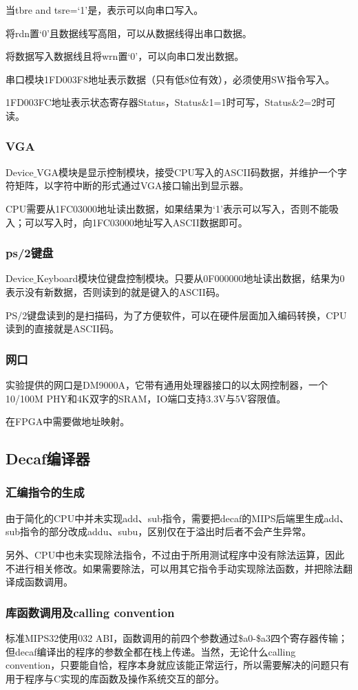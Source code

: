 当tbre and tsre=‘1’是，表示可以向串口写入。

将rdn置‘0’且数据线写高阻，可以从数据线得出串口数据。

将数据写入数据线且将wrn置‘0’，可以向串口发出数据。

串口模块1FD003F8地址表示数据（只有低8位有效），必须使用SW指令写入。

1FD003FC地址表示状态寄存器Status，Status$\&$1=1时可写，Status$\&$2=2时可读。
\subsubsection{VGA}
Device$\_$VGA模块是显示控制模块，接受CPU写入的ASCII码数据，并维护一个字符矩阵，以字符中断的形式通过VGA接口输出到显示器。

CPU需要从1FC03000地址读出数据，如果结果为‘1’表示可以写入，否则不能吸入；可以写入时，向1FC03000地址写入ASCII数据即可。
\subsubsection{ps/2键盘}
Device$\_$Keyboard模块位键盘控制模块。只要从0F000000地址读出数据，结果为0表示没有新数据，否则读到的就是键入的ASCII码。

PS/2键盘读到的是扫描码，为了方便软件，可以在硬件层面加入编码转换，CPU读到的直接就是ASCII码。
\subsubsection{网口}
实验提供的网口是DM9000A，它带有通用处理器接口的以太网控制器，一个10/100M PHY和4K双字的SRAM，IO端口支持3.3V与5V容限值。

在FPGA中需要做地址映射。
\subsection{Decaf编译器}
\subsubsection{汇编指令的生成}
由于简化的CPU中并未实现add、sub指令，需要把decaf的MIPS后端里生成add、sub指令的部分改成addu、subu，区别仅在于溢出时后者不会产生异常。

另外、CPU中也未实现除法指令，不过由于所用测试程序中没有除法运算，因此不进行相关修改。如果需要除法，可以用其它指令手动实现除法函数，并把除法翻译成函数调用。
\subsubsection{库函数调用及calling convention}
标准MIPS32使用032 ABI，函数调用的前四个参数通过\$a0-\$a3四个寄存器传输；但decaf编译出的程序的参数全都在栈上传递。当然，无论什么calling convention，只要能自恰，程序本身就应该能正常运行，所以需要解决的问题只有用于程序与C实现的库函数及操作系统交互的部分。

